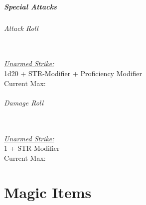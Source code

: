 \documentclass[letterpaper,openany,oneside,twocolumn]{book}
\newcommand{\PATH}{../../}
\begin{document}
\subsubsection*{Special Attacks}
\paragraph*{Attack Roll}\hfill\\
\underline{\textit{Unarmed Strike:}}\\
1d20 + STR-Modifier + Proficiency Modifier\\
\indent Current Max: 
\paragraph*{Damage Roll}\hfill\\
\underline{\textit{Unarmed Strike:}}\\
1 + STR-Modifier\\
\indent Current Max: 

\part*{Magic Items}


\end{document}
